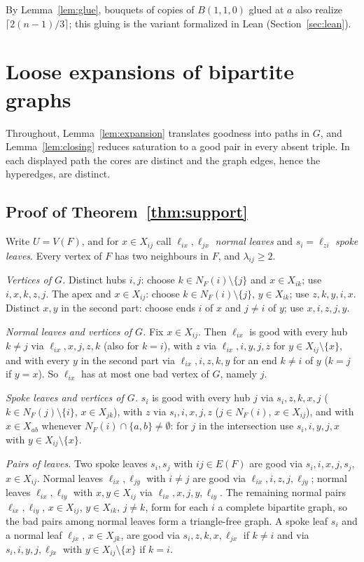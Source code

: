 \documentclass[11pt]{article}
\theoremstyle{remark}
\begin{document}
By Lemma~\ref{lem:glue}, bouquets of copies of $B(1,1,0)$ glued at $a$
also realize $\lceil2(n-1)/3\rceil$; this gluing is the variant
formalized in Lean (Section~\ref{sec:lean}).

\section{Loose expansions of bipartite graphs}\label{sec:expansion}

Throughout, Lemma~\ref{lem:expansion} translates goodness into paths in
$G$, and Lemma~\ref{lem:closing} reduces saturation to a good pair in
every absent triple. In each displayed path the cores are distinct and
the graph edges, hence the hyperedges, are distinct.

\subsection{Proof of Theorem~\ref{thm:support}}

Write $U=V(F)$, and for $x\in X_{ij}$ call $\ell_{ix},\ell_{jx}$
\emph{normal leaves} and $s_i=\ell_{zi}$ \emph{spoke leaves}. Every vertex
of $F$ has two neighbours in $F$, and $\lambda_{ij}\ge2$.

\emph{Vertices of $G$.} Distinct hubs $i,j$: choose $k\in N_F(i)\setminus\{j\}$
and $x\in X_{ik}$; use $i,x,k,z,j$. The apex and $x\in X_{ij}$: choose
$k\in N_F(i)\setminus\{j\}$, $y\in X_{ik}$; use $z,k,y,i,x$. Distinct
$x,y$ in the second part: choose ends $i$ of $x$ and $j\ne i$ of $y$; use
$x,i,z,j,y$.

\emph{Normal leaves and vertices of $G$.} Fix $x\in X_{ij}$. Then
$\ell_{ix}$ is good with every hub $k\ne j$ via $\ell_{ix},x,j,z,k$ (also
for $k=i$), with $z$ via $\ell_{ix},i,y,j,z$ for $y\in X_{ij}\setminus\{x\}$,
and with every $y$ in the second part via $\ell_{ix},i,z,k,y$ for an end
$k\ne i$ of $y$ ($k=j$ if $y=x$). So $\ell_{ix}$ has at most one bad
vertex of $G$, namely $j$.

\emph{Spoke leaves and vertices of $G$.} $s_i$ is good with every hub $j$
via $s_i,z,k,x,j$ ($k\in N_F(j)\setminus\{i\}$, $x\in X_{jk}$), with $z$ via
$s_i,i,x,j,z$ ($j\in N_F(i)$, $x\in X_{ij}$), and with $x\in X_{ab}$
whenever $N_F(i)\cap\{a,b\}\ne\emptyset$: for $j$ in the intersection use
$s_i,i,y,j,x$ with $y\in X_{ij}\setminus\{x\}$.

\emph{Pairs of leaves.} Two spoke leaves $s_i,s_j$ with $ij\in E(F)$ are
good via $s_i,i,x,j,s_j$, $x\in X_{ij}$. Normal leaves $\ell_{ix},\ell_{jy}$
with $i\ne j$ are good via $\ell_{ix},i,z,j,\ell_{jy}$; normal leaves
$\ell_{ix},\ell_{iy}$ with $x,y\in X_{ij}$ via $\ell_{ix},x,j,y,\ell_{iy}$.
The remaining normal pairs $\ell_{ix},\ell_{iy}$, $x\in X_{ij}$,
$y\in X_{ik}$, $j\ne k$, form for each $i$ a complete bipartite graph, so
the bad pairs among normal leaves form a triangle-free graph. A spoke leaf
$s_i$ and a normal leaf $\ell_{jx}$, $x\in X_{jk}$, are good via
$s_i,z,k,x,\ell_{jx}$ if $k\ne i$ and via $s_i,i,y,j,\ell_{jx}$ with
$y\in X_{ij}\setminus\{x\}$ if $k=i$.
\end{document}
